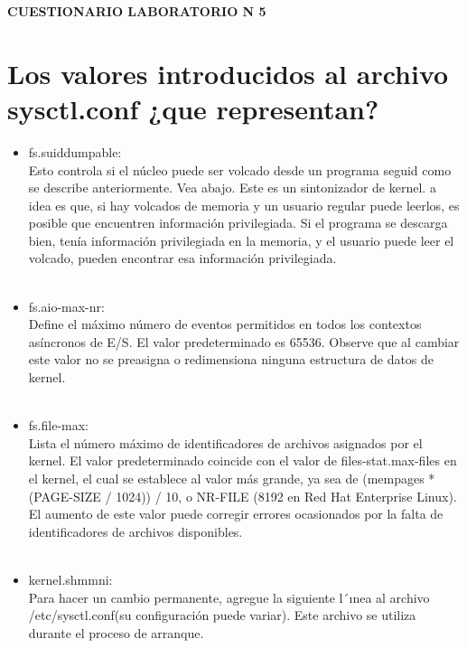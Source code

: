 
\begin{Large}
\begin{center}
\textbf{CUESTIONARIO LABORATORIO N 5} \\
\end{center}
\end{Large}

\section{Los valores introducidos al archivo sysctl.conf ¿que representan?} 


\begin{itemize}

\item fs.suiddumpable:\\
Esto controla si el núcleo puede ser volcado desde un programa seguid como se describe anteriormente. Vea abajo. Este es un sintonizador de kernel. a idea es que, si hay volcados de memoria y un usuario regular puede leerlos, es posible que encuentren información privilegiada. Si el programa se descarga bien, tenía información privilegiada en la memoria, y el usuario puede leer el volcado, pueden encontrar esa información privilegiada.\\\\

\item fs.aio-max-nr:\\
Define el máximo número de eventos permitidos en todos los contextos asíncronos de E/S. El valor predeterminado es 65536. Observe que al cambiar este valor no se preasigna o redimensiona ninguna estructura de datos de kernel.\\\\

\item fs.file-max:\\
Lista el número máximo de identificadores de archivos asignados por el kernel. El valor predeterminado coincide con el valor de files-stat.max-files en el kernel, el cual se establece al valor más grande, ya sea de (mempages * (PAGE-SIZE / 1024)) / 10, o NR-FILE (8192 en Red Hat Enterprise Linux). El aumento de este valor puede corregir errores ocasionados por la falta de identificadores de archivos disponibles.\\\\

\item kernel.shmmni:\\
Para hacer un cambio permanente, agregue la siguiente l´ınea al archivo /etc/sysctl.conf(su configuración puede variar). Este archivo se utiliza durante el proceso de arranque.\\\\


\end{itemize}
